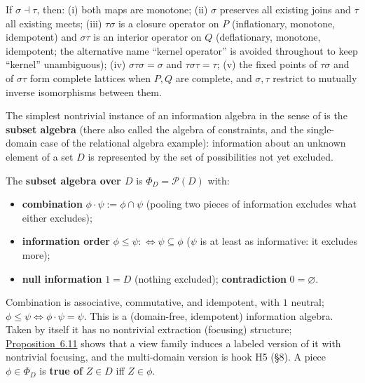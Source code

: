 \begin{thmplain}

\autocite{davey2002,erne1993} If \(\sigma \dashv \tau\), then: (i) both maps are monotone; (ii) \(\sigma\) preserves all existing joins and \(\tau\) all existing meets; (iii) \(\tau \sigma\) is a closure operator on \(P\) (inflationary, monotone, idempotent) and \(\sigma \tau\) is an interior operator on \(Q\) (deflationary, monotone, idempotent; the alternative name ``kernel operator'' is avoided throughout to keep ``kernel'' unambiguous); (iv) \(\sigma \tau \sigma = \sigma\) and \(\tau \sigma \tau = \tau\); (v) the fixed points of \(\tau\sigma\) and of \(\sigma\tau\) form complete lattices when \(P, Q\) are complete, and \(\sigma, \tau\) restrict to mutually inverse isomorphisms between them.
\end{thmplain}


The simplest nontrivial instance of an information algebra in the sense of \autocite{kohlas2003} is the \textbf{subset algebra} (there also called the algebra of constraints, and the single-domain case of the relational algebra example): information about an unknown element of a set \(D\) is represented by the set of possibilities not yet excluded.

\begin{thmdef}

The \textbf{subset algebra over \(D\)} is \(\Phi_D = \mathcal{P}(D)\) with:

\begin{itemize}
\tightlist
\item
  \textbf{combination} \(\phi \cdot \psi := \phi \cap \psi\) (pooling two pieces of information excludes what either excludes);
\item
  \textbf{information order} \(\phi \le \psi :\iff \psi \subseteq \phi\) (\(\psi\) is at least as informative: it excludes more);
\item
  \textbf{null information} \(1 = D\) (nothing excluded); \textbf{contradiction} \(0 = \varnothing\).
\end{itemize}
\end{thmdef}

Combination is associative, commutative, and idempotent, with \(1\) neutral; \(\phi \le \psi \iff \phi \cdot \psi = \psi\). This is a (domain-free, idempotent) information algebra. Taken by itself it has no nontrivial extraction (focusing) structure; \hyperlink{stmt:6.11}{Proposition~6.11} shows that a view family induces a labeled version of it with nontrivial focusing, and the multi-domain version is hook H5 (§8). A piece \(\phi \in \Phi_D\) is \textbf{true of} \(Z \in D\) iff \(Z \in \phi\).

